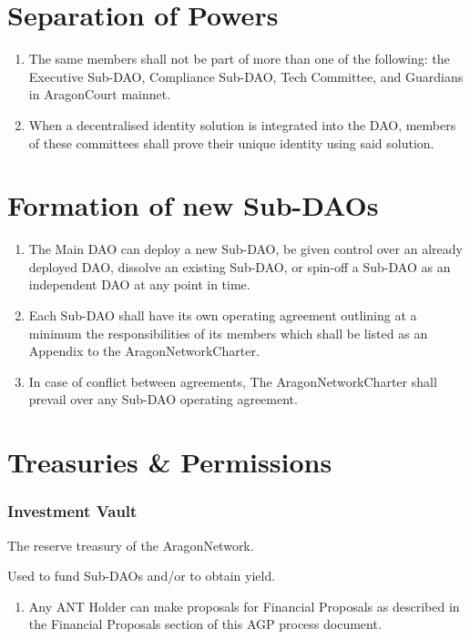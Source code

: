 \section{Separation of Powers}
\begin{enumerate}
	\item The same members shall not be part of more than one of the following: the Executive Sub-\ac{DAO}, Compliance Sub-\ac{DAO}, Tech Committee, and \glspl{Guardian} in \gls{AragonCourt} mainnet.
	\item When a decentralised identity solution is integrated into the \ac{DAO}, members of these committees shall prove their unique identity using said solution.
\end{enumerate}

\section{Formation of new Sub-DAOs}
\begin{enumerate}
	\item The Main \ac{DAO} can deploy a new Sub-\ac{DAO}, be given control over an already deployed \ac{DAO}, dissolve an existing Sub-\ac{DAO}, or spin-off a Sub-\ac{DAO} as an independent \ac{DAO} at any point in time.
	\item Each Sub-\ac{DAO} shall have its own operating agreement outlining at a minimum the responsibilities of its members which shall be listed as an Appendix to the \gls{AragonNetworkCharter}.
	\item In case of conflict between agreements, The \gls{AragonNetworkCharter} shall prevail over any Sub-\ac{DAO} operating agreement.
\end{enumerate}

\section{Treasuries \& Permissions}


\subsubsection*{Investment Vault} The reserve treasury of the \gls{AragonNetwork}.

Used to fund Sub-\acp{DAO} and/or to obtain yield.
\begin{enumerate}
	\item Any \ac{ANT} Holder can make proposals for Financial Proposals as described in the Financial Proposals section of this \ac{AGP} process document.
\end{enumerate}


